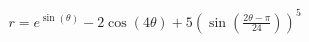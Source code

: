 \documentclass[preview]{standalone}
\begin{document}
\begin{align*}
r = e^{\sin(\theta)} - 2\cos(4\theta) + 5\left(\sin\left(\frac{2\theta - \pi}{24}\right)\right)^5
\end{align*}
\end{document}
